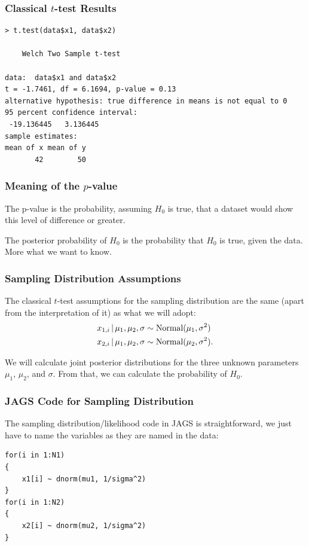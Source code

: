 \documentclass{beamer}
\newcommand{\given}{\,|\,}
\begin{document}
\begin{frame}[fragile]
\frametitle{Classical $t$-test Results}
\footnotesize
\begin{verbatim}
> t.test(data$x1, data$x2)

	Welch Two Sample t-test

data:  data$x1 and data$x2
t = -1.7461, df = 6.1694, p-value = 0.13
alternative hypothesis: true difference in means is not equal to 0
95 percent confidence interval:
 -19.136445   3.136445
sample estimates:
mean of x mean of y 
       42        50 
\end{verbatim}

\end{frame}


\begin{frame}[fragile]
\frametitle{Meaning of the $p$-value}
The p-value is the probability, assuming $H_0$ is true, that a dataset would
show this level of difference or greater.\\[0.5em]\pause

The posterior probability of $H_0$ is the probability that $H_0$ is true,
given the data. More what we want to know.
\end{frame}

\begin{frame}
\frametitle{Sampling Distribution Assumptions}
The classical $t$-test assumptions for the sampling distribution are the same
(apart from the interpretation of it) as what we will adopt:
\begin{align}
x_{1, i} \given \mu_1, \mu_2, \sigma &\sim \textnormal{Normal}(\mu_1, \sigma^2) \\
x_{2, i} \given \mu_1, \mu_2, \sigma &\sim \textnormal{Normal}(\mu_2, \sigma^2).
\end{align}
\pause

We will calculate joint posterior distributions for the
three  unknown parameters $\mu_1$, $\mu_2$, and
$\sigma$. From that, we can calculate the probability of $H_0$.


\end{frame}

\begin{frame}[fragile]
\frametitle{JAGS Code for Sampling Distribution}
The sampling distribution/likelihood code in JAGS is straightforward,
we just have to name the variables as they are named in the data:
\begin{verbatim}
for(i in 1:N1)
{
    x1[i] ~ dnorm(mu1, 1/sigma^2)
}
for(i in 1:N2)
{
    x2[i] ~ dnorm(mu2, 1/sigma^2)
}
\end{verbatim}

\end{frame}
\end{document}
